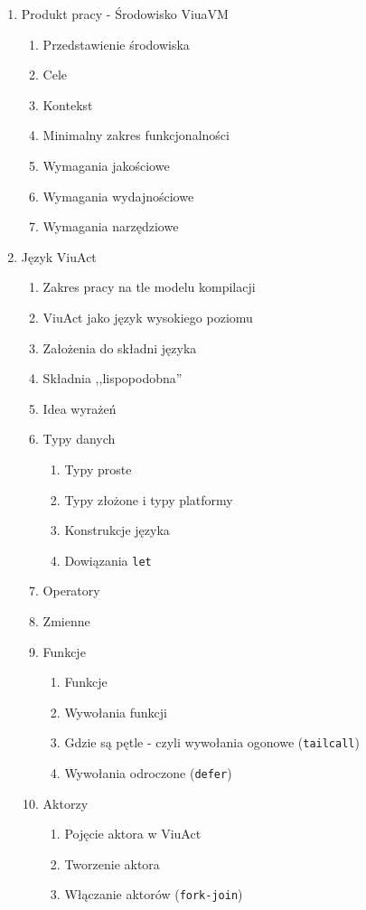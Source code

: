 \documentclass[11pt,oneside,a4paper,twocolumn]{article}
\begin{document}
\begin{enumerate}
	\item Produkt pracy - Środowisko ViuaVM
	\begin{enumerate}
		\item Przedstawienie środowiska
		\item Cele
		\item Kontekst
		\item Minimalny zakres funkcjonalności
		\item Wymagania jakościowe
		\item Wymagania wydajnościowe
		\item Wymagania narzędziowe
	\end{enumerate}
	
	\item Język ViuAct
	\begin{enumerate}
		\item Zakres pracy na tle modelu kompilacji
		\item ViuAct jako język wysokiego poziomu
		\item Założenia do składni języka
		\item Składnia ,,lispopodobna''
		\item Idea wyrażeń
		\item Typy danych
		\begin{enumerate}
			\item Typy proste
			\item Typy złożone i typy platformy
			\item Konstrukcje języka
			\item Dowiązania \texttt{let}
		\end{enumerate}				
		\item Operatory
		\item Zmienne
		\item Funkcje
		\begin{enumerate}
			\item Funkcje
			\item Wywołania funkcji
			\item Gdzie są pętle - czyli wywołania ogonowe (\texttt{tailcall})
			\item Wywołania odroczone (\texttt{defer})
		\end{enumerate}
		\item Aktorzy
		\begin{enumerate}
			\item Pojęcie aktora w ViuAct
			\item Tworzenie aktora
			\item Włączanie aktorów (\texttt{fork-join})

\end{enumerate}
\end{enumerate}
\end{enumerate}
\end{document}
